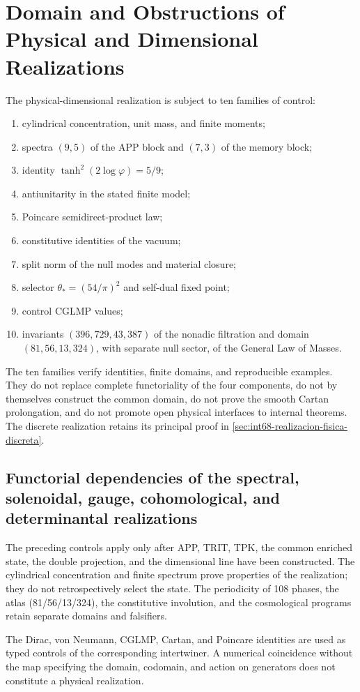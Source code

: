 \section[Physical-Dimensional Implementation Controls]{Domain and Obstructions of Physical and Dimensional Realizations}
\label{sec:int68-certificado-historico}

The physical-dimensional realization is subject to ten families of control:
\begin{enumerate}
 \item cylindrical concentration, unit mass, and finite moments;
 \item spectra \((9,5)\) of the APP block and \((7,3)\) of the memory block;
 \item identity \(\tanh^2(2\log\varphi)=5/9\);
 \item antiunitarity in the stated finite model;
 \item Poincare semidirect-product law;
 \item constitutive identities of the vacuum;
 \item split norm of the null modes and material closure;
 \item selector \(\theta_*=(54/\pi)^2\) and self-dual fixed point;
 \item control CGLMP values;
 \item invariants \((396,729,43,387)\) of the nonadic filtration and
       domain \((81,56,13,324)\), with separate null sector, of the General
       Law of Masses.
\end{enumerate}

\begin{controlbox}[title={Exact scope of the controls}]
The ten families verify identities, finite domains, and reproducible
examples. They do not replace complete functoriality of the four
components, do not by themselves construct the common domain, do not prove the
smooth Cartan prolongation, and do not promote open physical interfaces to
internal theorems. The discrete realization retains its principal proof
in \cref{sec:int68-realizacion-fisica-discreta}.
\end{controlbox}

\subsection{Functorial dependencies of the spectral, solenoidal, gauge, cohomological, and determinantal realizations}

The preceding controls apply only after APP, TRIT, TPK,
the common enriched state, the double projection, and the dimensional line have been constructed. The
cylindrical concentration and finite spectrum prove properties of the
realization; they do not retrospectively select the state. The periodicity of
108 phases, the atlas (81/56/13/324), the constitutive involution, and the
cosmological programs retain separate domains and falsifiers.

The Dirac, von Neumann, CGLMP, Cartan, and Poincare identities are used
as typed controls of the corresponding intertwiner. A numerical
coincidence without the map specifying the domain, codomain, and action on generators does not
constitute a physical realization.
